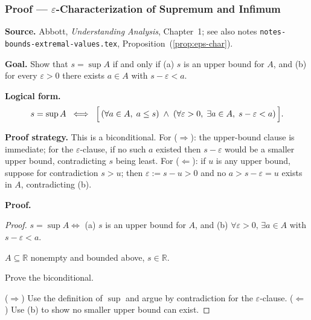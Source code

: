 
\clearpage
{}
\hypertarget{proof-RA-ABB-P-eps-char-sup}{}

\subsubsection[$\varepsilon$-Characterization of Supremum]{Proof --- $\varepsilon$-Characterization of Supremum and Infimum}

\bigskip

\noindent
\textbf{Source.}
Abbott, \emph{Understanding Analysis}, Chapter~1; see also notes
\texttt{notes-bounds-extremal-values.tex}, Proposition~(\ref{prop:eps-char}).

\vspace{0.75em}

\noindent
\textbf{Goal.}
Show that $s = \sup A$ if and only if (a) $s$ is an upper bound for $A$,
and (b) for every $\varepsilon > 0$ there exists $a \in A$ with
$s - \varepsilon < a$.

\vspace{0.75em}

\noindent
\textbf{Logical form.}
\[
  s = \sup A
  \;\iff\;
  \Bigl[\,
    (\forall a \in A,\; a \le s)
    \;\wedge\;
    (\forall \varepsilon > 0,\; \exists a \in A,\; s - \varepsilon < a)
  \,\Bigr].
\]

\vspace{0.75em}

\noindent
\textbf{Proof strategy.}
This is a biconditional. For ($\Rightarrow$): the upper-bound clause is
immediate; for the $\varepsilon$-clause, if no such $a$ existed then
$s - \varepsilon$ would be a smaller upper bound, contradicting $s$ being
least. For ($\Leftarrow$): if $u$ is any upper bound, suppose for
contradiction $s > u$; then $\varepsilon := s - u > 0$ and no $a > s - \varepsilon = u$ exists in $A$, contradicting (b).

\vspace{0.75em}

\noindent
\textbf{Proof.}
\begin{proof}
\Claim $s = \sup A \iff$ (a) $s$ is an upper bound for $A$, and (b)
$\forall \varepsilon > 0,\, \exists a \in A$ with $s - \varepsilon < a$.

\Given $A \subseteq \mathbb{R}$ nonempty and bounded above, $s \in \mathbb{R}$.

\Goal Prove the biconditional.

\Strategy ($\Rightarrow$) Use the definition of $\sup$ and argue by
contradiction for the $\varepsilon$-clause.
($\Leftarrow$) Use (b) to show no smaller upper bound can exist.

\medskip



\end{proof}

